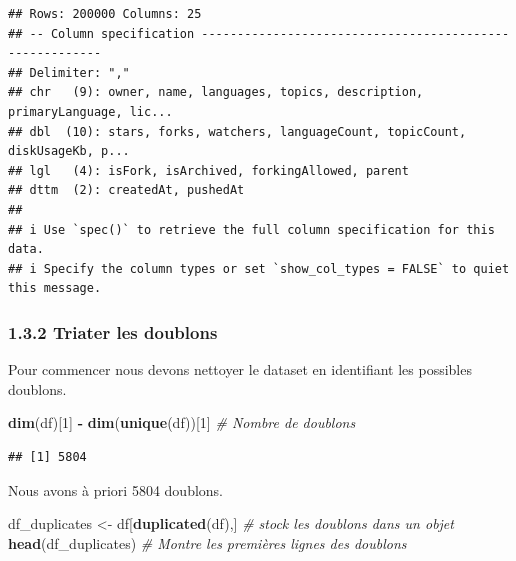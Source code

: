 \documentclass[
]{article}
\newenvironment{Shaded}{\begin{snugshade}}{\end{snugshade}}
\newcommand{\CommentTok}[1]{\textcolor[rgb]{0.56,0.35,0.01}{\textit{#1}}}
\newcommand{\DecValTok}[1]{\textcolor[rgb]{0.00,0.00,0.81}{#1}}
\newcommand{\FunctionTok}[1]{\textcolor[rgb]{0.13,0.29,0.53}{\textbf{#1}}}
\newcommand{\NormalTok}[1]{#1}
\newcommand{\OtherTok}[1]{\textcolor[rgb]{0.56,0.35,0.01}{#1}}
\newcommand{\SpecialCharTok}[1]{\textcolor[rgb]{0.81,0.36,0.00}{\textbf{#1}}}
\begin{document}
\begin{verbatim}
## Rows: 200000 Columns: 25
## -- Column specification --------------------------------------------------------
## Delimiter: ","
## chr   (9): owner, name, languages, topics, description, primaryLanguage, lic...
## dbl  (10): stars, forks, watchers, languageCount, topicCount, diskUsageKb, p...
## lgl   (4): isFork, isArchived, forkingAllowed, parent
## dttm  (2): createdAt, pushedAt
## 
## i Use `spec()` to retrieve the full column specification for this data.
## i Specify the column types or set `show_col_types = FALSE` to quiet this message.
\end{verbatim}

\subsubsection{1.3.2 Triater les doublons}\label{triater-les-doublons}

Pour commencer nous devons nettoyer le dataset en identifiant les
possibles doublons.

\begin{Shaded}
\begin{Highlighting}[]
\FunctionTok{dim}\NormalTok{(df)[}\DecValTok{1}\NormalTok{] }\SpecialCharTok{{-}} \FunctionTok{dim}\NormalTok{(}\FunctionTok{unique}\NormalTok{(df))[}\DecValTok{1}\NormalTok{] }\CommentTok{\# Nombre de doublons}
\end{Highlighting}
\end{Shaded}

\begin{verbatim}
## [1] 5804
\end{verbatim}

Nous avons à priori 5804 doublons.

\begin{Shaded}
\begin{Highlighting}[]
\NormalTok{df\_duplicates }\OtherTok{\textless{}{-}}\NormalTok{ df[}\FunctionTok{duplicated}\NormalTok{(df),] }\CommentTok{\# stock les doublons dans un objet}
\FunctionTok{head}\NormalTok{(df\_duplicates) }\CommentTok{\# Montre les premières lignes des doublons}
\end{Highlighting}
\end{Shaded}
\end{document}
